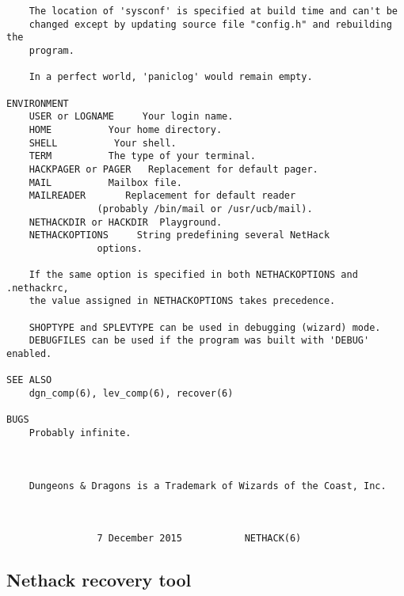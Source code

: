 \documentclass[11pt]{article}
\begin{document}
\begin{verbatim}
    The location of 'sysconf' is specified at build time and can't be
    changed except by updating source file "config.h" and rebuilding the
    program.

    In a perfect world, 'paniclog' would remain empty.

ENVIRONMENT
    USER or LOGNAME     Your login name.
    HOME          Your home directory.
    SHELL          Your shell.
    TERM          The type of your terminal.
    HACKPAGER or PAGER   Replacement for default pager.
    MAIL          Mailbox file.
    MAILREADER       Replacement for default reader
                (probably /bin/mail or /usr/ucb/mail).
    NETHACKDIR or HACKDIR  Playground.
    NETHACKOPTIONS     String predefining several NetHack
                options.

    If the same option is specified in both NETHACKOPTIONS and .nethackrc,
    the value assigned in NETHACKOPTIONS takes precedence.

    SHOPTYPE and SPLEVTYPE can be used in debugging (wizard) mode.
    DEBUGFILES can be used if the program was built with 'DEBUG' enabled.

SEE ALSO
    dgn_comp(6), lev_comp(6), recover(6)

BUGS
    Probably infinite.



    Dungeons & Dragons is a Trademark of Wizards of the Coast, Inc.



                7 December 2015           NETHACK(6)
\end{verbatim}

\subsection{Nethack recovery tool}
\label{sec:orge187a43}
\end{document}
